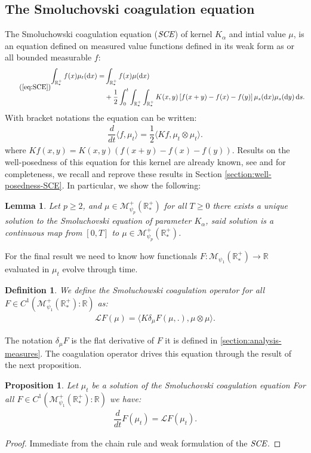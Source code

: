 \documentclass[11pt,a4paper]{article}
\newcommand{\RR}{\mathbb{R}}
\newcommand{\RRP}{\mathbb{R}^+_*}
\newcommand{\MC}{\mathcal{M}}
\newcommand{\LC}{\mathcal{L}}
\newcommand{\SCE}{\emph{SCE}}
\newcommand{\dd}{\mathop{}\!\mathrm{d}}
\newtheorem{lemma}[theorem]{Lemma}
\newtheorem{proposition}[theorem]{Proposition}
\newtheorem{definition}[theorem]{Definition}
\begin{document}
\subsection{The Smoluchovski coagulation equation}
The Smoluchowski coagulation equation ($\SCE$) of kernel $K_\alpha$ and intial value $\mu$, is an equation defined on measured value functions defined in its weak form as or all bounded measurable $f$:
\begin{equation}\tag{\ref{eq:SCE}}
\begin{aligned}
    \int_{\RRP} f(x)\mu_t (\dd x) =& \int_{\RRP} f(x)\mu (\dd x)\\
     &+ \dfrac12\int_0^t \int_{\RRP}\int_{\RRP} 
        K(x,y)\left[f(x+y) - f(x) - f(y)\right] \mu_s(\dd x)\mu_s(\dd y) \dd s.
\end{aligned}
\end{equation}
With bracket notations the equation can be written:
\begin{align*}
    \dfrac{d}{dt}\langle f,\mu_t \rangle = \dfrac12\langle Kf , \mu_t \otimes \mu_t\rangle.
\end{align*}
where $Kf(x,y) = K(x,y)\left(f(x+y) - f(x) - f(y) \right)$. Results on the well-posedness of this equation for this kernel are already known, see \cite{norris1999smoluchowski} and for completeness, we recall and reprove these results in Section \ref{section:well-posedness-SCE}. In particular, we show the following:
\begin{lemma}\label{lem:well_posedness_smol_eq}
    Let $p \geq 2$, and $\mu \in \MC_{\psi_p}^+ (\RRP)$ for all $T \geq 0$ there exists a unique solution to the Smoluchovski equation of parameter $K_\alpha$, said solution is a continuous map from $[0,T]$ to $\mu \in \MC_{\psi_p}^+ (\RRP)$.
\end{lemma}
For the final result we need to know how functionals $F : \MC_{\psi_1}(\RRP) \to \RR$ evaluated in $\mu_t$ evolve through time.
\begin{definition}
    We define the Smoluchowski coagulation operator for all $F \in C^1(\MC^+_{\psi_1}\left(\RRP\right):\RR)$ as:
    \begin{align*}
        \LC F(\mu) = \langle K\delta_\mu F(\mu,.) , \mu\otimes \mu\rangle.
    \end{align*}
\end{definition}
The notation $\delta_\mu F$ is the flat derivative of $F$ it is defined in \ref{section:analysis-measures}. The coagulation operator drives this equation through the result of the next proposition.
\begin{proposition}
    Let $\mu_t$ be a solution of the Smoluchovski coagulation equation For all $F \in C^1(\MC_{\psi_1}^+\left(\RRP \right):\RR)$ we have:
    \begin{align*}
        \dfrac{d}{dt} F( \mu_t) = \LC F(\mu_t).
    \end{align*}
\end{proposition}
\begin{proof}
    Immediate from the chain rule and weak formulation of the $\SCE$.
\end{proof}
    
\end{document}
